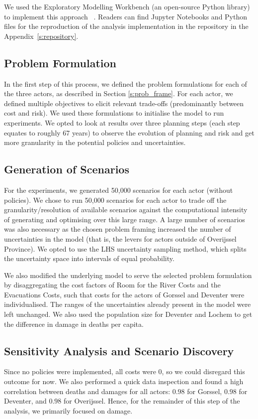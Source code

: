 We used the Exploratory Modelling Workbench (an open-source Python library) to implement this approach ~\parencite{kwakkel_exploratory_2017}. Readers can find Jupyter Notebooks and Python files for the reproduction of the analysis implementation in the repository in the Appendix~\ref{s:repository}.

\subsection{Problem Formulation}
In the first step of this process, we defined the problem formulations for each of the three actors, as described in Section \ref{s:prob_frame}. For each actor, we defined multiple objectives to elicit relevant trade-offs (predominantly between cost and risk). We used these formulations to initialise the model to run experiments. We opted to look at results over three planning steps (each step equates to roughly 67 years) to observe the evolution of planning and risk and get more granularity in the potential policies and uncertainties.

\subsection{Generation of Scenarios}
For the experiments, we generated 50,000 scenarios for each actor (without policies). We chose to run 50,000 scenarios for each actor to trade off the granularity/resolution of available scenarios against the computational intensity of generating and optimising over this large range. A large number of scenarios was also necessary as the chosen problem framing increased the number of uncertainties in the model (that is, the levers for actors outside of Overijssel Province). We opted to use the LHS uncertainty sampling method, which splits the uncertainty space into intervals of equal probability.

We also modified the underlying model to serve the selected problem formulation by disaggregating the cost factors of Room for the River Costs and the Evacuations Costs, such that costs for the actors of Gorssel and Deventer were individualised. The ranges of the uncertainties already present in the model were left unchanged. We also used the population size for Deventer and Lochem to get the difference in damage in deaths per capita. 


\subsection{Sensitivity Analysis and Scenario Discovery}
Since no policies were implemented, all costs were 0, so we could disregard this outcome for now. We also performed a quick data inspection and found a high correlation between deaths and damages for all actors: $0.98$ for Gorssel, $0.98$ for Deventer, and $0.98$ for Overijssel. Hence, for the remainder of this step of the analysis, we primarily focused on damage.


